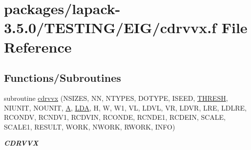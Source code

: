 \hypertarget{cdrvvx_8f}{}\section{packages/lapack-\/3.5.0/\+T\+E\+S\+T\+I\+N\+G/\+E\+I\+G/cdrvvx.f File Reference}
\label{cdrvvx_8f}
\subsection*{Functions/\+Subroutines}
\begin{DoxyCompactItemize}
\item 
subroutine \hyperlink{group__complex__eig_ga2de5d5cdd79b4ab56fd984ac860f1b36}{cdrvvx} (N\+S\+I\+Z\+E\+S, N\+N, N\+T\+Y\+P\+E\+S, D\+O\+T\+Y\+P\+E, I\+S\+E\+E\+D, \hyperlink{zlaqgs_8c_a0656018abfc9fa2821827415f5d5ea57}{T\+H\+R\+E\+S\+H}, N\+I\+U\+N\+I\+T, N\+O\+U\+N\+I\+T, \hyperlink{classA}{A}, \hyperlink{example__user_8c_ae946da542ce0db94dced19b2ecefd1aa}{L\+D\+A}, H, W, W1, V\+L, L\+D\+V\+L, V\+R, L\+D\+V\+R, L\+R\+E, L\+D\+L\+R\+E, R\+C\+O\+N\+D\+V, R\+C\+N\+D\+V1, R\+C\+D\+V\+I\+N, R\+C\+O\+N\+D\+E, R\+C\+N\+D\+E1, R\+C\+D\+E\+I\+N, S\+C\+A\+L\+E, S\+C\+A\+L\+E1, R\+E\+S\+U\+L\+T, W\+O\+R\+K, N\+W\+O\+R\+K, R\+W\+O\+R\+K, I\+N\+F\+O)
\begin{DoxyCompactList}\small\item\em {\bfseries C\+D\+R\+V\+V\+X} \end{DoxyCompactList}\end{DoxyCompactItemize}
